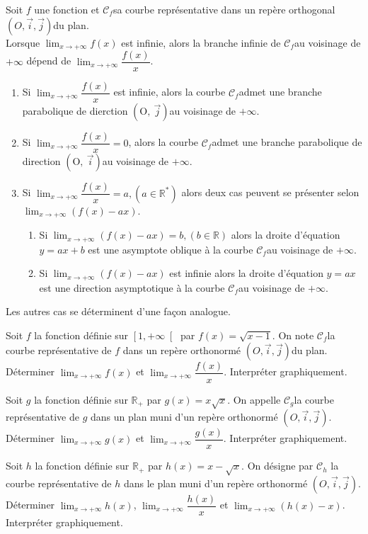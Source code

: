 \documentclass[12pt,a4paper,x11names,usenames,dvipsnames,svgnames,oneside]{book}
\def\skn{\tcbsubskin{skn}{empty}{frame code={%
}}}
\newenvironment{rem}{\skn\boxxr\tcbtitle}{\endboxxr}
\def\skn{\tcbsubskin{skn}{empty}{frame code={%
}}}
\def\Oj{$\left(\text{O},~\overrightarrow{j}\right)$}
\def\Oi{$\left(\text{O},~\overrightarrow{i}\right)$}
\def\R{\mathbb{R}}
\newcommand{\cf}{$ \mathscr{C}_{f} $}
\newcommand{\cg}{$ \mathscr{C}_{g} $}
\newcommand{\oij}{$ (O,\overrightarrow{i},\overrightarrow{j}) $}
\begin{document}
\begin{thr}
Soit $f$ une fonction et \cf sa courbe représentative dans un repère orthogonal \oij du plan.\\
Lorsque $\lim_{x\to+\infty}f(x)$ est infinie, alors la branche infinie de \cf au voisinage de $+\infty$ dépend de $\lim_{x\to+\infty}\dfrac{f(x)}{x}$.
\begin{enumerate}

\item Si $\lim_{x\to+\infty}\dfrac{f(x)}{x}$ est infinie, alors la courbe \cf admet une branche parabolique de dierction \Oj au voisinage de $+\infty$.
\item Si $\lim_{x\to+\infty}\dfrac{f(x)}{x}=0$, alors la courbe \cf admet une branche parabolique de direction \Oi au voisinage de $+\infty$.
\item Si $\lim_{x\to+\infty}\dfrac{f(x)}{x}=a, (a\in\R^*)$ alors deux cas peuvent se présenter selon $\lim_{x\to+\infty}(f(x)-ax)$.
\begin{enumerate}
\item Si $\lim_{x\to+\infty}(f(x)-ax)=b, (b\in\R)$ alors la droite d'équation $y=ax+b$ est une asymptote oblique à la courbe \cf au voisinage de $+\infty$.
\item Si $\lim_{x\to+\infty}(f(x)-ax)$ est infinie alors la droite d'équation $y=ax$ est une direction asymptotique à la courbe \cf au voisinage de $+\infty$.
\end{enumerate}
\end{enumerate}
\end{thr}
\begin{rem}
Les autres cas se déterminent d'une façon analogue.
\end{rem}
\begin{exr}
Soit $f$ la fonction définie sur $\left[ {1, + \infty } \right[$ par $f(x)=\sqrt{x-1}$. On note \cf la courbe représentative de $f$ dans un repère orthonormé \oij du plan.\\
Déterminer $\lim_{x\to+\infty}f(x)$ et $\lim_{x\to+\infty}\dfrac{f(x)}{x}$. Interpréter graphiquement.
\end{exr}
\begin{exr}
Soit $g$ la fonction définie sur $\R_+$ par $g(x)=x\sqrt{x}$. On appelle \cg la courbe représentative de $g$ dans un plan muni d'un repère orthonormé \oij.\\
Déterminer $\lim_{x\to+\infty}g(x)$ et $\lim_{x\to+\infty}\dfrac{g(x)}{x}$. Interpréter graphiquement.
\end{exr}
\begin{exr}
Soit $h$ la fonction définie sur $\R_+$ par $h(x)=x-\sqrt{x}$. On désigne par $\mathscr C_h$ la courbe représentative de $h$ dans le plan muni d'un repère orthonormé \oij.\\
Déterminer $\lim_{x\to+\infty}h(x)$, $\lim_{x\to+\infty}\dfrac{h(x)}{x}$ et $\lim_{x\to+\infty}(h(x)-x)$. Interpréter graphiquement.
\end{exr}
\end{document}
